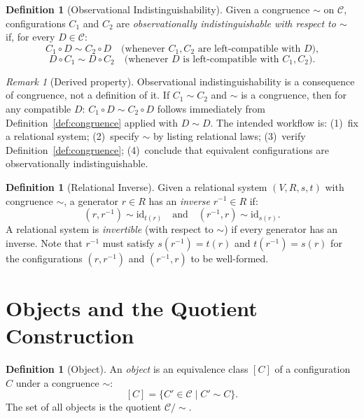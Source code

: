 \documentclass{article}
\theoremstyle{definition}
\newtheorem{definition}[theorem]{Definition}
\theoremstyle{remark}
\newtheorem{remark}[theorem]{Remark}
\newcommand{\RC}{\mathcal{C}}
\newcommand{\id}{\mathrm{id}}
\begin{document}
\begin{definition}[Observational Indistinguishability]
\label{def:obs-indist}
Given a congruence $\sim$ on $\RC$, configurations $C_1$ and
$C_2$ are \emph{observationally indistinguishable with respect
to $\sim$} if, for every $D \in \RC$:
\[
  C_1 \circ D \sim C_2 \circ D
  \quad\text{(whenever } C_1, C_2 \text{ are left-compatible with } D\text{),}
\]
\[
  D \circ C_1 \sim D \circ C_2
  \quad\text{(whenever } D \text{ is left-compatible with } C_1, C_2\text{).}
\]
\end{definition}

\begin{remark}[Derived property]
\label{rem:no-circularity}
Observational indistinguishability is a consequence of congruence,
not a definition of it. If $C_1 \sim C_2$ and $\sim$ is a
congruence, then for any compatible $D$: $C_1 \circ D \sim C_2 \circ D$
follows immediately from Definition~\ref{def:congruence} applied
with $D \sim D$. The intended workflow is: (1)~fix a relational
system; (2)~specify $\sim$ by listing relational laws;
(3)~verify Definition~\ref{def:congruence}; (4)~conclude that
equivalent configurations are observationally indistinguishable.
\end{remark}

\begin{definition}[Relational Inverse]
\label{def:inverse}
Given a relational system $(V, R, s, t)$ with congruence $\sim$,
a generator $r \in R$ has an \emph{inverse} $r^{-1} \in R$ if:
\[
  (r, r^{-1}) \sim \id_{t(r)}
  \quad\text{and}\quad
  (r^{-1}, r) \sim \id_{s(r)}.
\]
A relational system is \emph{invertible} (with respect to $\sim$)
if every generator has an inverse. Note that $r^{-1}$ must satisfy
$s(r^{-1}) = t(r)$ and $t(r^{-1}) = s(r)$ for the configurations
$(r, r^{-1})$ and $(r^{-1}, r)$ to be well-formed.
\end{definition}

\section{Objects and the Quotient Construction}
\label{sec:quotient}

\begin{definition}[Object]
\label{def:object}
An \emph{object} is an equivalence class $[C]$ of a configuration
$C$ under a congruence $\sim$:
\[
  [C] = \{ C' \in \RC \mid C' \sim C \}.
\]
The set of all objects is the quotient $\RC/{\sim}$.
\end{definition}
\end{document}
